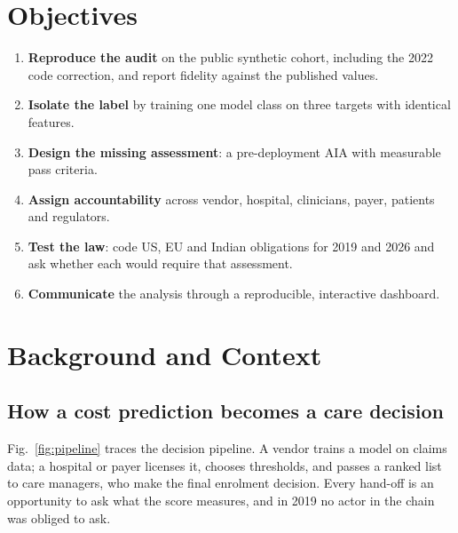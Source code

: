 \documentclass[conference]{IEEEtran}
\begin{document}
\section{Objectives}
\begin{enumerate}
\item \textbf{Reproduce the audit} on the public synthetic cohort, including the 2022 code correction, and report fidelity against the published values.
\item \textbf{Isolate the label} by training one model class on three targets with identical features.
\item \textbf{Design the missing assessment}: a pre-deployment AIA with measurable pass criteria.
\item \textbf{Assign accountability} across vendor, hospital, clinicians, payer, patients and regulators.
\item \textbf{Test the law}: code US, EU and Indian obligations for 2019 and 2026 and ask whether each would require that assessment.
\item \textbf{Communicate} the analysis through a reproducible, interactive dashboard.
\end{enumerate}

\section{Background and Context}
\subsection{How a cost prediction becomes a care decision}
Fig.~\ref{fig:pipeline} traces the decision pipeline. A vendor trains a model on claims data; a hospital or payer licenses it, chooses thresholds, and passes a ranked list to care managers, who make the final enrolment decision. Every hand-off is an opportunity to ask what the score measures, and in 2019 no actor in the chain was obliged to ask.
\end{document}
